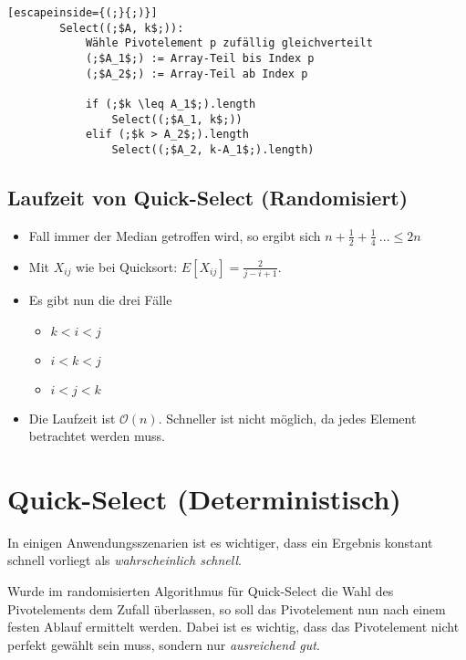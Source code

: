 \documentclass{scrartcl}%
\begin{document}
    \begin{lstlisting}[escapeinside={(;}{;)}]
        Select((;$A, k$;)):
            Wähle Pivotelement p zufällig gleichverteilt
            (;$A_1$;) := Array-Teil bis Index p
            (;$A_2$;) := Array-Teil ab Index p

            if (;$k \leq A_1$;).length
                Select((;$A_1, k$;))
            elif (;$k > A_2$;).length
                Select((;$A_2, k-A_1$;).length)
    \end{lstlisting}

    \subsection*{Laufzeit von Quick-Select (Randomisiert)}\label{subsec:laufzeitVonQuick-selectrandomisiert}
    \begin{itemize}
        \item Fall immer der Median getroffen wird, so ergibt sich $n+\frac{1}{2}+\frac{1}{4}\ ... \leq 2n$
        \item Mit $X_{ij}$ wie bei Quicksort: $E[X_{ij}] = \frac{2}{j-i+1}$.
        \item [] Es gibt nun die drei Fälle
        \begin{itemize}
            \item $k<i<j$
            \item $i<k<j$
            \item $i<j<k$
        \end{itemize}
        \item [\Rightarrow] Die Laufzeit ist $\mathcal{O}(n)$.
        Schneller ist nicht möglich, da jedes Element betrachtet werden muss.
    \end{itemize}

    \section*{Quick-Select (Deterministisch)}\label{sec:quick-selectdeterministisch}
    In einigen Anwendungsszenarien ist es wichtiger, dass ein Ergebnis konstant schnell vorliegt als \textit{wahrscheinlich schnell}.

    Wurde im randomisierten Algorithmus für Quick-Select die Wahl des Pivotelements dem Zufall überlassen,
    so soll das Pivotelement nun nach einem festen Ablauf ermittelt werden.
    Dabei ist es wichtig, dass das Pivotelement nicht perfekt gewählt sein muss, sondern nur \textit{ausreichend gut}.
\end{document}
